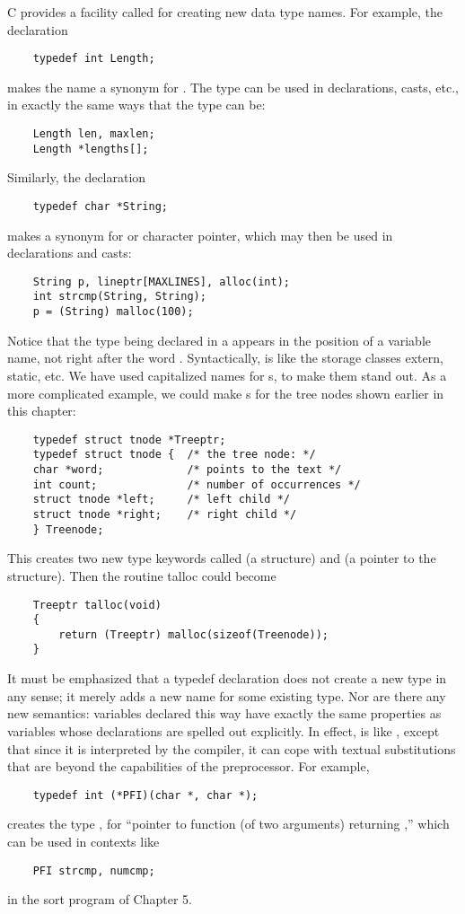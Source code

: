 C provides a facility called  for creating new data type names. For example, the declaration
\begin{lstlisting}
	typedef int Length;
\end{lstlisting}
makes the name  a synonym for . The type  can be used in declarations, casts, etc., in exactly the same ways that the  type can be:
\begin{lstlisting}
	Length len, maxlen;
	Length *lengths[];
\end{lstlisting}
Similarly, the declaration
\begin{lstlisting}
	typedef char *String;
\end{lstlisting}
makes  a synonym for  or character pointer, which may then be used in declarations and casts:
\begin{lstlisting}
	String p, lineptr[MAXLINES], alloc(int);
	int strcmp(String, String);
	p = (String) malloc(100);
\end{lstlisting}
Notice that the type being declared in a  appears in the position of a variable name, not right after the word .
Syntactically,  is like the storage classes extern, static, etc.
We have used capitalized names for s, to make them stand out.
As a more complicated example, we could make s for the tree nodes shown earlier in this chapter:
\begin{lstlisting}
	typedef struct tnode *Treeptr;
	typedef struct tnode { 	/* the tree node: */
	char *word; 			/* points to the text */
	int count; 				/* number of occurrences */
	struct tnode *left; 	/* left child */
	struct tnode *right; 	/* right child */
	} Treenode;
\end{lstlisting}
This creates two new type keywords called  (a structure) and  (a pointer to the structure).
Then the routine talloc could become
\begin{lstlisting}
	Treeptr talloc(void)
	{
		return (Treeptr) malloc(sizeof(Treenode));
	}
\end{lstlisting}
It must be emphasized that a typedef declaration does not create a new type in any sense; it merely adds a new name for some existing type.
Nor are there any new semantics: variables declared this way have exactly the same properties as variables whose declarations are spelled out explicitly.
In effect,  is like , except that since it is interpreted by the compiler, it can cope with textual substitutions that are beyond the capabilities of the preprocessor.
For example,
\begin{lstlisting}
	typedef int (*PFI)(char *, char *);
\end{lstlisting}
creates the type , for ``pointer to function (of two  arguments) returning ,'' which can be used in contexts like
\begin{lstlisting}
	PFI strcmp, numcmp;
\end{lstlisting}
in the sort program of Chapter 5.

